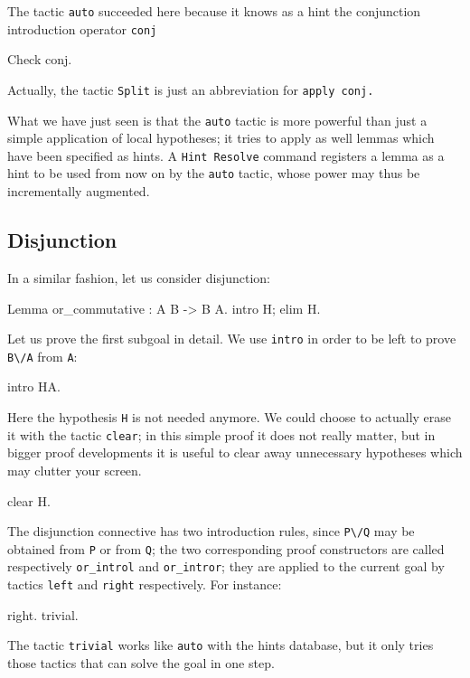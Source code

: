 \documentclass[11pt,a4paper]{book}
\begin{document}
The tactic \verb:auto: succeeded here because it knows as a hint the 
conjunction introduction operator \verb+conj+
\begin{coq_example}
Check conj.
\end{coq_example}

Actually, the tactic \verb+Split+ is just an abbreviation for \verb+apply conj.+

What we have just seen is that the \verb:auto: tactic is more powerful than
just a simple application of local hypotheses; it tries to apply as well 
lemmas which have been specified as hints. A 
\verb:Hint Resolve: command registers a
lemma as a hint to be used from now on by the \verb:auto: tactic, whose power 
may thus be incrementally augmented.

\subsection{Disjunction}

In a similar fashion, let us consider disjunction:

\begin{coq_example}
Lemma or_commutative : A \/ B -> B \/ A.
intro H; elim H.
\end{coq_example}

Let us prove the first subgoal in detail. We use \verb:intro: in order to
be left to prove \verb:B\/A: from \verb:A::

\begin{coq_example}
intro HA.
\end{coq_example}

Here the hypothesis \verb:H: is not needed anymore. We could choose to
actually erase it with the tactic \verb:clear:; in this simple proof it
does not really matter, but in bigger proof developments it is useful to
clear away unnecessary hypotheses which may clutter your screen.
\begin{coq_example}
clear H.
\end{coq_example}

The disjunction connective has two introduction rules, since \verb:P\/Q:
may be obtained from \verb:P: or from \verb:Q:; the two corresponding
proof constructors are called respectively \verb:or_introl: and
\verb:or_intror:; they are applied to the current goal by tactics
\verb:left: and \verb:right: respectively. For instance:
\begin{coq_example}
right.
trivial.
\end{coq_example}
The tactic \verb:trivial: works like \verb:auto: with the hints
database, but it only tries those tactics that can solve the goal in one
step. 
\end{document}
